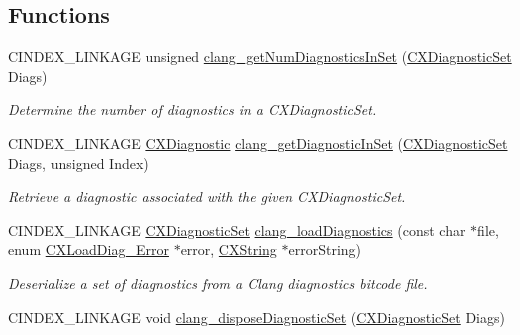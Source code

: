 \subsection*{Functions}
\begin{DoxyCompactItemize}
\item 
\mbox{\label{group__CINDEX__DIAG_ga44e87e54125e501de0d3bd29161fe26b}} 
C\+I\+N\+D\+E\+X\+\_\+\+L\+I\+N\+K\+A\+GE unsigned \hyperlink{group__CINDEX__DIAG_ga44e87e54125e501de0d3bd29161fe26b}{clang\+\_\+get\+Num\+Diagnostics\+In\+Set} (\hyperlink{group__CINDEX__DIAG_ga38dfc0ae45b55bf7fd577eed9148e244}{C\+X\+Diagnostic\+Set} Diags)
\begin{DoxyCompactList}\small\item\em Determine the number of diagnostics in a C\+X\+Diagnostic\+Set. \end{DoxyCompactList}\item 
C\+I\+N\+D\+E\+X\+\_\+\+L\+I\+N\+K\+A\+GE \hyperlink{group__CINDEX__DIAG_ga44bb8aba7c40590ad25d1763c4fbff7f}{C\+X\+Diagnostic} \hyperlink{group__CINDEX__DIAG_ga997e07d587e02eea7d29874c33c94249}{clang\+\_\+get\+Diagnostic\+In\+Set} (\hyperlink{group__CINDEX__DIAG_ga38dfc0ae45b55bf7fd577eed9148e244}{C\+X\+Diagnostic\+Set} Diags, unsigned Index)
\begin{DoxyCompactList}\small\item\em Retrieve a diagnostic associated with the given C\+X\+Diagnostic\+Set. \end{DoxyCompactList}\item 
C\+I\+N\+D\+E\+X\+\_\+\+L\+I\+N\+K\+A\+GE \hyperlink{group__CINDEX__DIAG_ga38dfc0ae45b55bf7fd577eed9148e244}{C\+X\+Diagnostic\+Set} \hyperlink{group__CINDEX__DIAG_gaa1e3aff15dc2eb97330533f0c68bd28f}{clang\+\_\+load\+Diagnostics} (const char $\ast$file, enum \hyperlink{group__CINDEX__DIAG_gafccf4d49329805ac24e6dc005aafc848}{C\+X\+Load\+Diag\+\_\+\+Error} $\ast$error, \hyperlink{structCXString}{C\+X\+String} $\ast$error\+String)
\begin{DoxyCompactList}\small\item\em Deserialize a set of diagnostics from a Clang diagnostics bitcode file. \end{DoxyCompactList}\item 
\mbox{\label{group__CINDEX__DIAG_ga1a1126b07e4dc0b45b0617f3cc848d57}} 
C\+I\+N\+D\+E\+X\+\_\+\+L\+I\+N\+K\+A\+GE void \hyperlink{group__CINDEX__DIAG_ga1a1126b07e4dc0b45b0617f3cc848d57}{clang\+\_\+dispose\+Diagnostic\+Set} (\hyperlink{group__CINDEX__DIAG_ga38dfc0ae45b55bf7fd577eed9148e244}{C\+X\+Diagnostic\+Set} Diags)

\end{DoxyCompactItemize}
